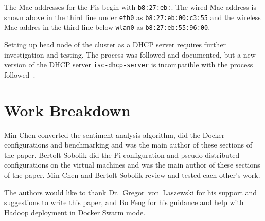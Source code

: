 The Mac addresses for the Pis begin with \verb|b8:27:eb:|. The wired
Mac address is shown above in the third line under \verb|eth0|
as \verb|b8:27:eb:00:c3:55| and the wireless Mac addres in the third
line below \verb|wlan0| as \verb|b8:27:eb:55:96:00|.

Setting up head node of the cluster as a DHCP server requires further
investigation and testing. The process was followed and documented,
but a new version of the DHCP server \verb|isc-dhcp-server| is
incompatible with the process followed~\cite{hid-sp18-419-pi-DHCP}.

\section{Work Breakdown}
Min Chen converted the sentiment analysis algorithm, did the Docker
configurations and benchmarking and was the main author of these
sections of the paper. Bertolt Sobolik did the Pi configuration and
pseudo-distributed configurations on the virtual machines and was the
main author of these sections of the paper. Min Chen and Bertolt
Sobolik review and tested each other's work.

\begin{acks}

  The authors would like to thank Dr.~Gregor~von~Laszewski for his
  support and suggestions to write this paper, and Bo Feng for his guidance 
  and help with Hadoop deployment in Docker Swarm mode.

\end{acks}



